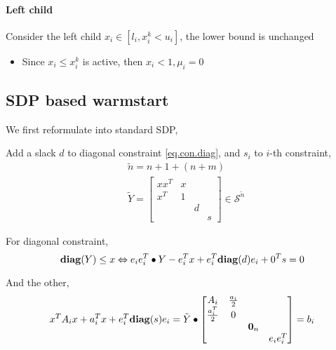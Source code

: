 \documentclass[../main]{subfiles}
\begin{document}
\paragraph{Left child}
Consider the left child \(x_i \in [l_i, x_i^k < u_i]\), the lower bound is unchanged
\begin{itemize}
    \item Since \(x_i \le x_i^k\) is active, then \(x_i < 1, \mu_i = 0\)
\end{itemize}

\subsection{SDP based warmstart}
We first reformulate into standard SDP,

Add a slack \(d\) to diagonal constraint \eqref{eq.con.diag}, and \(s_i\) to \(i\)-th constraint,
\begin{equation}
    \begin{aligned}
         & \tilde n = n + 1 + (n + m)                                       \\
         & \tilde{Y} = \begin{bmatrix}
            xx^T & x &   &   \\
            x^T  & 1 &   &   \\
                 &   & d &   \\
                 &   &   & s
        \end{bmatrix}\in \mathscr S^{\tilde{n}}
    \end{aligned}
\end{equation}

For diagonal constraint,
\begin{equation*}
    \mathbf{diag}(Y) \le x \Leftrightarrow e_ie_i^T \bullet Y - e_i^T x + e_i^T\mathbf{diag}(d)e_i + 0^Ts = 0
\end{equation*}

And the other,
\begin{equation}
    x^TA_ix + a_i^Tx + e_i^T\mathbf{diag}(s)e_i = \tilde{Y} \bullet    \begin{bmatrix}
        A_i             & \frac{a_i}{2} &         &          \\
        \frac{a_i^T}{2} & 0             &         &          \\
                        &               & \bm 0_n &          \\
                        &               &         & e_ie_i^T
    \end{bmatrix} = b_i
\end{equation}
\end{document}
